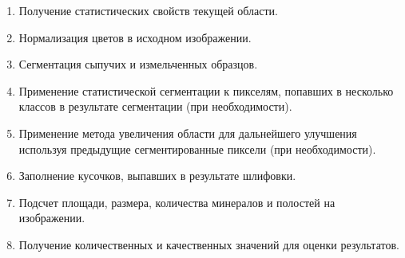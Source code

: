 \begin{enumerate}[nosep]
    \item Получение статистических свойств текущей области.
    \item Нормализация цветов в исходном изображении.
    \item Сегментация сыпучих и измельченных образцов.
    \item Применение статистической сегментации к пикселям, попавших в несколько классов в результате сегментации (при необходимости). 
    \item Применение метода увеличения области для дальнейшего улучшения используя предыдущие сегментированные пиксели (при необходимости).
    \item Заполнение кусочков, выпавших в результате шлифовки.
    \item Подсчет площади, размера, количества минералов и полостей на изображении. 
    \item Получение количественных и качественных значений для оценки результатов.
\end{enumerate}

\newpage
